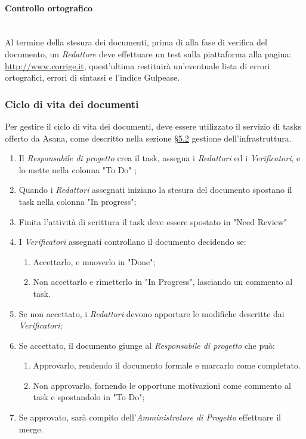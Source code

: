 \paragraph{Controllo ortografico}\mbox{}\\
Al termine della stesura dei documenti, prima di alla fase di verifica del documento, un \textit{Redattore} deve effettuare un test sulla piattaforma alla pagina: \url{ http://www.corrige.it}, quest’ultima restituirà un’eventuale lista di errori ortografici, errori di sintassi e l’indice {Gulpease}.

\subsubsection{Ciclo di vita dei documenti}
Per gestire il ciclo di vita dei documenti, deve essere utilizzato il servizio di tasks offerto da Asana, come descritto nella sezione \hyperref[sec:documentversion]{§5.2} gestione dell'infrastruttura.
\begin{enumerate}
\item Il \textit{Responsabile di progetto} crea il task, assegna i \textit{Redattori} ed i \textit{Verificatori}, e lo mette nella colonna "To Do" ;
\item Quando i \textit{Redattori} assegnati iniziano la stesura del documento spostano il task nella colonna "In progress";
\item Finita l'attività di scrittura il task deve essere spostato in "Need Review"
\item I \textit{Verificatori} assegnati controllano il documento decidendo se:
	\begin{enumerate}
	 	\item Accettarlo, e muoverlo in "Done";
	 	\item Non accettarlo e rimetterlo in "In Progress", lasciando un commento al task.
	\end{enumerate}
\item Se non accettato, i \textit{Redattori} devono apportare le modifiche descritte dai \textit{Verificatori};
\item Se accettato, il documento giunge al \textit{Responsabile di progetto} che può:
\begin{enumerate}
	\item Approvarlo, rendendo il documento formale e marcarlo come completato.
	\item Non approvarlo, fornendo le opportune motivazioni come commento al task e spostandolo in "To Do";
\end{enumerate}
\item Se approvato, sarà compito dell'\textit{Amministratore di Progetto} effettuare il merge.
\end{enumerate}
